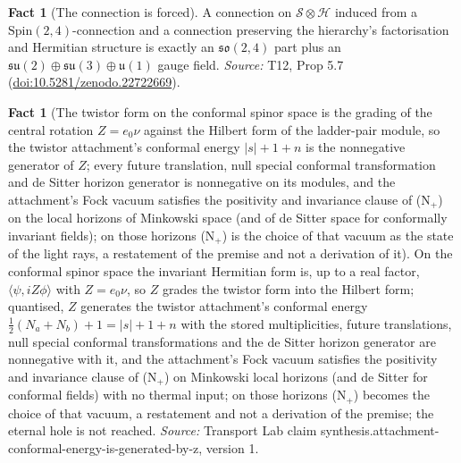 \documentclass[11pt]{article}
\theoremstyle{definition}
\newtheorem{fact}[theorem]{Fact}
\theoremstyle{plain}
\providecommand{\so}{}\renewcommand{\so}{\mathfrak{so}}
\providecommand{\su}{}\renewcommand{\su}{\mathfrak{su}}
\providecommand{\uu}{}\renewcommand{\uu}{\mathfrak{u}}
\providecommand{\ip}{}\renewcommand{\ip}[2]{\langle #1, #2\rangle}
\begin{document}
\begin{fact}[The connection is forced]\label{c:standard-model.connection-forced}
A connection on $\mathcal{S} \otimes \mathcal{H}$ induced from a $\mathrm{Spin}(2,4)$-connection and a connection preserving the hierarchy's factorisation and Hermitian structure is exactly an $\so(2,4)$ part plus an $\su(2) \oplus \su(3) \oplus \uu(1)$ gauge field.
\emph{Source:} T12, Prop 5.7 (\href{https://doi.org/10.5281/zenodo.22722669}{doi:10.5281/zenodo.22722669}).
\end{fact}

\begin{fact}[The twistor form on the conformal spinor space is the grading of the central rotation $Z = e_{0}\nu$ against the Hilbert form of the ladder-pair module, so the twistor attachment's conformal energy $|s| + 1 + n$ is the nonnegative generator of $Z$; every future translation, null special conformal transformation and de Sitter horizon generator is nonnegative on its modules, and the attachment's Fock vacuum satisfies the positivity and invariance clause of (N$_{+}$) on the local horizons of Minkowski space (and of de Sitter space for conformally invariant fields); on those horizons (N$_{+}$) is the choice of that vacuum as the state of the light rays, a restatement of the premise and not a derivation of it]\label{c:synthesis.attachment-conformal-energy-is-generated-by-z}
On the conformal spinor space the invariant Hermitian form is, up to a real factor, $\ip{\psi}{iZ\phi}$ with $Z = e_{0}\nu$, so $Z$ grades the twistor form into the Hilbert form; quantised, $Z$ generates the twistor attachment's conformal energy $\tfrac12(N_{a} + N_{b}) + 1 = |s| + 1 + n$ with the stored multiplicities, future translations, null special conformal transformations and the de Sitter horizon generator are nonnegative with it, and the attachment's Fock vacuum satisfies the positivity and invariance clause of (N$_{+}$) on Minkowski local horizons (and de Sitter for conformal fields) with no thermal input; on those horizons (N$_{+}$) becomes the choice of that vacuum, a restatement and not a derivation of the premise; the eternal hole is not reached.
\emph{Source:} Transport Lab claim synthesis.attachment-conformal-energy-is-generated-by-z, version 1.
\end{fact}
\end{document}
